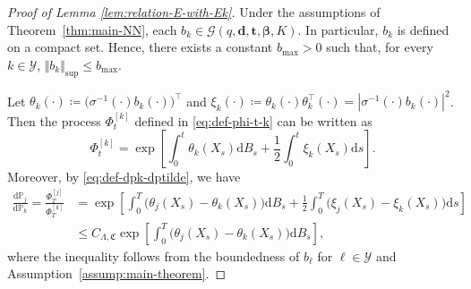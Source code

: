 \documentclass{article}
\theoremstyle{plain}
\theoremstyle{definition}
\theoremstyle{remark}
\renewcommand{\d}{\mathrm{d}}
\newcommand{\PP}{\mathbb{P}}
\newcommand{\calY}{\mathcal{Y}}
\begin{document}
\begin{proof}[Proof of Lemma \ref{lem:relation-E-with-Ek}]
Under the assumptions of Theorem~\ref{thm:main-NN}, each $b_k\in \mathcal{G}(q,\mathbf{d}, \mathbf{t},\boldsymbol{\beta}, K)$. In particular, $b_k$ is defined on a compact set. Hence,  there exists a constant $b_{\max}>0$ such that, for every $k\in\calY$, $\Vert b_k\Vert_{\sup}\leq b_{\max}$. 


Let $\theta_k(\cdot)\coloneqq \big(\sigma^{-1}(\cdot)b_k(\cdot)\big)^{\top}$ and $\xi_k(\cdot)\coloneqq \theta_k(\cdot)\theta_k^{\top}(\cdot)=|\sigma^{-1}(\cdot)b_k(\cdot)|^2$. Then the process $\Phi_t^{[k]}$ defined in \eqref{eq:def-phi-t-k} can be written as
\[
\Phi_t^{[k]} = \exp \left [  \int_{0}^{t}\theta_k(X_s)\d B_s + \frac{1}{2}\int_{0}^t\xi_k(X_s)\d s\right]. 
\]
Moreover, by \eqref{eq:def-dpk-dptilde}, we have 
\begin{align}\label{eq:upper-bound-change-density}
    \frac{\d \PP_j}{\d \PP_k}= \frac{\Phi_T^{[j]}}{\Phi_T^{[k]}}&= \exp \left [  \int_{0}^{T}\big(\theta_j(X_s)-\theta_k(X_s)\big)\d B_s + \frac{1}{2}\int_{0}^T\big(\xi_j(X_s)-\xi_k(X_s)\big)\d s\right]\nonumber\\
    &\leq C_{\Lambda, \mathfrak{C}}  \exp \left [  \int_{0}^{T}\big(\theta_j(X_s)-\theta_k(X_s)\big)\d B_s\right],
\end{align}
where the inequality follows from the boundedness of $b_\ell$ for $\ell\in\mathcal Y$
and Assumption~\ref{assump:main-theorem}.


\end{proof}
\end{document}
